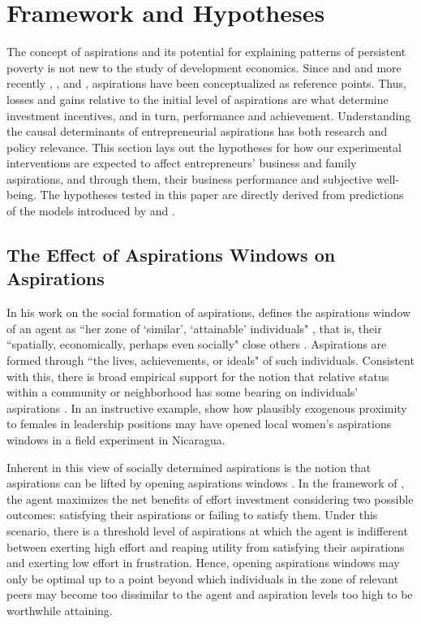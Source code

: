 \documentclass[11.5pt]{article}
\begin{document}
\section{Framework and Hypotheses} \label{sec:theory}

The concept of aspirations and its potential for explaining patterns of persistent poverty is not new to the study of development economics. Since \citet{Simon1955} and \citet{Selten1998} and more recently \citet{Bogliacino2014}, \citet{Dalton2016}, and \citet{Genicot2017}, aspirations have been conceptualized as reference points. Thus, losses and gains relative to the initial level of aspirations are what determine investment incentives, and in turn, performance and achievement. Understanding the causal determinants of entrepreneurial aspirations has both research and policy relevance. This section lays out the hypotheses for how our experimental interventions are expected to affect entrepreneurs' business and family aspirations, and through them, their business performance and subjective well-being. The hypotheses tested in this paper are directly derived from predictions of the models introduced by \citet{Dalton2016} and \citet{Genicot2017}.

\subsection{The Effect of Aspirations Windows on Aspirations}

In his work on the social formation of aspirations, \citet{Ray2003, Ray2006} defines the aspirations window of an agent as ``her zone of  `similar', `attainable' individuals" \citep[][p.1]{Ray2003}, that is, their ``spatially, economically, perhaps even socially" close others \citep[][p.2]{Ray2003}. Aspirations are formed through ``the lives, achievements, or ideals" \citep[][p.2]{Ray2003} of such individuals. Consistent with this, there is broad empirical support for the notion that relative status within a community or neighborhood has some bearing on individuals' aspirations \citep[][]{Bernard2014, Beaman2012, Janzen2017, Knight2012, Stutzer2004}. In an instructive example, \citet{Macours2014} show how plausibly exogenous proximity to females in leadership positions may have opened local women's aspirations windows in a field experiment in Nicaragua.

Inherent in this view of socially determined aspirations is the notion that aspirations can be lifted by opening aspirations windows \citep[see,][]{Ray2006, Genicot2017, Janzen2017}. In the framework of \citet{Genicot2017}, the agent maximizes the net benefits of effort investment considering two possible outcomes: satisfying their aspirations or failing to satisfy them. Under this scenario, there is a threshold level of aspirations at which the agent is indifferent between exerting high effort and reaping utility from satisfying their aspirations and exerting low effort in frustration. Hence, opening aspirations windows may only be optimal up to a point beyond which individuals in the zone of relevant peers may become too dissimilar to the agent and aspiration levels too high to be worthwhile attaining.
\end{document}
